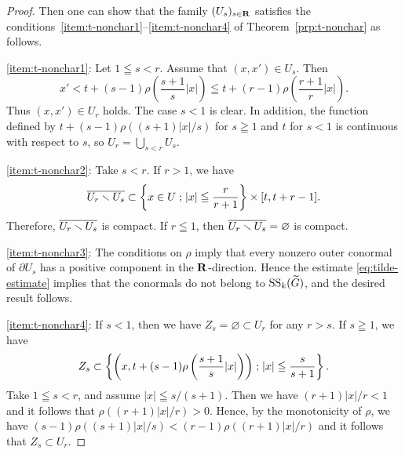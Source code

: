 \begin{proof}

  Then one can show that 
  the family \((U_{s})_{s\in\rr}\) satisfies 
  the conditions~\eqref{item:t-nonchar1}--\eqref{item:t-nonchar4} of 
  Theorem~\ref{prp:t-nonchar} as follows.
  
  \eqref{item:t-nonchar1}: 
  Let \(1\leqq s<r\). 
  Assume that \((x,x')\in U_s\). Then
  \[
    x'
    < t+ (s-1)\rho\left(\frac{s+1}{s}\left|x\right|\right)
    \leqq t+ (r-1)\rho\left(\frac{r+1}{r}\left|x\right|\right).
  \]
  Thus \((x,x')\in U_{r}\) holds. The case \(s<1\) is clear.
  In addition, 
  the function defined by \(t+(s-1)\rho((s+1)|x|/s)\) for \(s\geqq 1\) 
  and \(t\) for \(s<1\) 
  is continuous with respect to \(s\), 
  so \(U_{r}=\bigcup_{s<r}U_{s}\).

  \eqref{item:t-nonchar2}: 
  Take \(s<r\). If \(r>1\), we have 
  \[
    \overline{U_{r}\smi U_{s}}
    \subset
    \left\{x\in U\smid |x|\leqq \frac{r}{r+1}\right\}\times [t,t+r-1]. 
  \]
  Therefore, \(\overline{U_{r}\smi U_{s}}\) is compact. 
  If \(r\leqq1\), then \(\overline{U_{r}\smi U_{s}}=\varnothing\) is compact.

  \eqref{item:t-nonchar3}: 
  The conditions on \(\rho\) imply that 
  every nonzero outer conormal of \(\partial U_{s}\) has a positive component 
  in the \(\rr\)-direction. 
  Hence the estimate \eqref{eq:tilde-estimate} implies 
  that the conormals do not belong to 
  \(\muS[k](\widetilde{G})\), and the desired result follows. 

  \eqref{item:t-nonchar4}: 
  If \(s<1\), 
  then we have \(Z_{s}=\varnothing \subset U_{r}\) for any \(r>s\). 
  If \(s\geqq1\), we have \[
    Z_{s}\subset \left\{\left(x,t+(s-1)\rho\left(\frac{s+1}{s}|x|\right)\right)\smid |x|\leqq \frac{s}{s+1}\right\}.
  \]
  Take \(1\leqq s<r\), and assume \(|x|\leqq s/(s+1)\). 
  Then we have \((r+1)|x|/r<1\)
  and it follows that \(\rho((r+1)|x|/r)>0\).
  Hence, by the monotonicity of \(\rho\), 
  we have \((s-1)\rho((s+1)|x|/s)<(r-1)\rho((r+1)|x|/r)\) and 
  it follows that \(Z_{s} \subset U_r\).






\end{proof}
